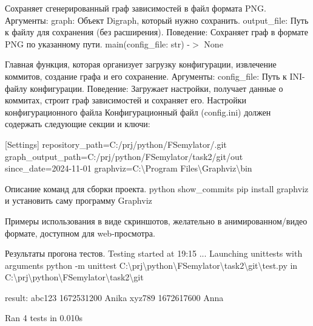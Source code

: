 Сохраняет сгенерированный граф зависимостей в файл формата PNG. Аргументы\+: graph\+: Объект Digraph, который нужно сохранить. output\+\_\+file\+: Путь к файлу для сохранения (без расширения). Поведение\+: Сохраняет граф в формате PNG по указанному пути. main(config\+\_\+file\+: str) -\/$>$ None

Главная функция, которая организует загрузку конфигурации, извлечение коммитов, создание графа и его сохранение. Аргументы\+: config\+\_\+file\+: Путь к INI-\/файлу конфигурации. Поведение\+: Загружает настройки, получает данные о коммитах, строит граф зависимостей и сохраняет его. Настройки конфигурационного файла Конфигурационный файл (config.\+ini) должен содержать следующие секции и ключи\+:

[Settings] repository\+\_\+path=C\+:/prj/python/\+FSemylator/.git graph\+\_\+output\+\_\+path=C\+:/prj/python/\+FSemylator/task2/git/out since\+\_\+date=2024-\/11-\/01 graphviz=C\+:\textbackslash{}\+Program Files\textbackslash{}\+Graphviz\textbackslash{}bin


\begin{DoxyEnumerate}
\item Описание команд для сборки проекта. python show\+\_\+commits pip install graphviz и установить саму программу Graphviz
\item Примеры использования в виде скриншотов, желательно в анимированном/видео формате, доступном для web-\/просмотра. 
\item Результаты прогона тестов. Testing started at 19\+:15 ... Launching unittests with arguments python -\/m unittest C\+:\textbackslash{}prj\textbackslash{}python\textbackslash{}\+FSemylator\textbackslash{}task2\textbackslash{}git\textbackslash{}test.py in C\+:\textbackslash{}prj\textbackslash{}python\textbackslash{}\+FSemylator\textbackslash{}task2\textbackslash{}git
\end{DoxyEnumerate}

result\+: abc123 1672531200 Anika xyz789 1672617600 Anna

Ran 4 tests in 0.\+010s 